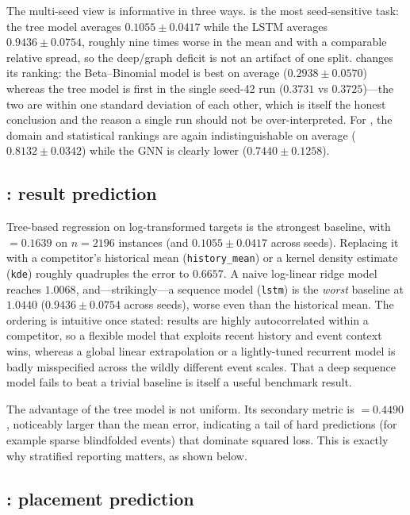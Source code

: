The multi-seed view is informative in three ways.  is the most
seed-sensitive task: the tree model averages $0.1055\pm0.0417$ while the LSTM
averages $0.9436\pm0.0754$, roughly nine times worse in the mean and with a
comparable relative spread, so the deep/graph deficit is not an artifact of one
split.  changes its ranking: the Beta--Binomial model is best on
average ($0.2938\pm0.0570$) whereas the tree model is first in the single
seed-42 run ($0.3731$ vs $0.3725$)---the two are within one standard deviation
of each other, which is itself the honest conclusion and the reason a single
run should not be over-interpreted. For , the domain and statistical
rankings are again indistinguishable on average ($0.8132\pm0.0342$) while the
GNN is clearly lower ($0.7440\pm0.1258$).

\subsection{: result prediction}
\label{sec:results-t1}

Tree-based regression on log-transformed targets is the strongest 
baseline, with \maelog{} $=0.1639$ on $n=2196$ instances (and
$0.1055\pm0.0417$ across seeds). Replacing it with a competitor's historical
mean (\texttt{history\_mean}) or a kernel density estimate (\texttt{kde})
roughly quadruples the error to $0.6657$. A naive log-linear ridge model
reaches $1.0068$, and---strikingly---a sequence model (\texttt{lstm}) is the
\emph{worst} baseline at $1.0440$ ($0.9436\pm0.0754$ across seeds), worse even
than the historical mean. The ordering is intuitive once stated: results are
highly autocorrelated within a competitor, so a flexible model that exploits
recent history and event context wins, whereas a global linear extrapolation or
a lightly-tuned recurrent model is badly misspecified across the wildly
different event scales. That a deep sequence model fails to beat a trivial
baseline is itself a useful benchmark result.

The advantage of the tree model is not uniform. Its secondary metric is
\rmselog{} $=0.4490$, noticeably larger than the mean error, indicating a tail
of hard predictions (for example sparse blindfolded events) that dominate
squared loss. This is exactly why stratified reporting matters, as shown below.

\subsection{: placement prediction}
\label{sec:results-t2}

